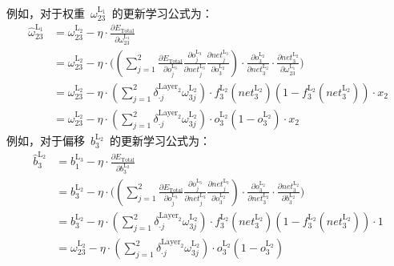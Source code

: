 \documentclass[a4paper, UTF8, heading = true, scheme = chinese, linespread = 1.66, titlepage]{ctexart}
\begin{document}
例如，对于权重~$\omega^{\text{L}_1}_{23}$~的更新学习公式为：
\begin{align}
\widehat{\omega}^{\text{L}_1}_{23} &= \omega^{\text{L}_2}_{23} - \eta \cdot \frac{\partial E_{\text{Total}}}{\partial \omega^{\text{L}_1}_{23}} \\
&= \omega^{\text{L}_2}_{23} - \eta \cdot \big((\sum_{j=1}^{2}{\frac{\partial E_{\text{Total}}}{\partial o^{\text{L}_3}_{j}} \frac{\partial o^{\text{L}_3}_{j}}{\partial net^{\text{L}_3}_j} \frac{\partial net^{\text{L}_3}_j}{\partial o^{\text{L}_2}_{3}}})  \cdot \frac{\partial o^{\text{L}_2}_{3}}{\partial net^{\text{L}_2}_3} \cdot \frac{\partial net^{\text{L}_2}_3}{\partial \omega^{\text{L}_1}_{23}}\big) \\
&= \omega^{\text{L}_2}_{23} - \eta \cdot (\sum_{j=1}^{2}{\delta^{\text{Layer}_2}_{\cdot j} \omega^{\text{L}_2}_{3j}}) \cdot f^{\text{L}_2}_{3}{(net^{\text{L}_2}_3)}(1 - f^{\text{L}_2}_{3}{(net^{\text{L}_2}_3)}) \cdot x_2 \\
&= \omega^{\text{L}_2}_{23} - \eta \cdot (\sum_{j=1}^{2}{\delta^{\text{Layer}_2}_{\cdot j} \omega^{\text{L}_2}_{3j}}) \cdot o^{\text{L}_2}_{3}(1 - o^{\text{L}_2}_{3}) \cdot x_2
\end{align}
例如，对于偏移~$b^{\text{L}_2}_{3}$~的更新学习公式为：
\begin{align}
\hat{b}^{\text{L}_2}_{3} &= b^{\text{L}_3}_{1} - \eta \cdot \frac{\partial E_{\text{Total}}}{\partial b^{\text{L}_2}_{3}} \\
&= b^{\text{L}_2}_{3} - \eta \cdot \big((\sum_{j=1}^{2}{\frac{\partial E_{\text{Total}}}{\partial o^{\text{L}_3}_{j}} \frac{\partial o^{\text{L}_3}_{j}}{\partial net^{\text{L}_3}_j} \frac{\partial net^{\text{L}_3}_j}{\partial o^{\text{L}_2}_{3}}})  \cdot \frac{\partial o^{\text{L}_2}_{3}}{\partial net^{\text{L}_2}_3} \cdot \frac{\partial net^{\text{L}_2}_3}{\partial b^{\text{L}_2}_{3}}\big) \\
&=  b^{\text{L}_2}_{3} - \eta \cdot (\sum_{j=1}^{2}{\delta^{\text{Layer}_2}_{\cdot j} \omega^{\text{L}_2}_{3j}}) \cdot f^{\text{L}_2}_{3}{(net^{\text{L}_2}_3)}(1 - f^{\text{L}_2}_{3}{(net^{\text{L}_2}_3)}) \cdot 1 \\
&= \omega^{\text{L}_2}_{23} - \eta \cdot (\sum_{j=1}^{2}{\delta^{\text{Layer}_2}_{\cdot j} \omega^{\text{L}_2}_{3j}}) \cdot o^{\text{L}_2}_{3}(1 - o^{\text{L}_2}_{3})
\end{align}

\end{document}
